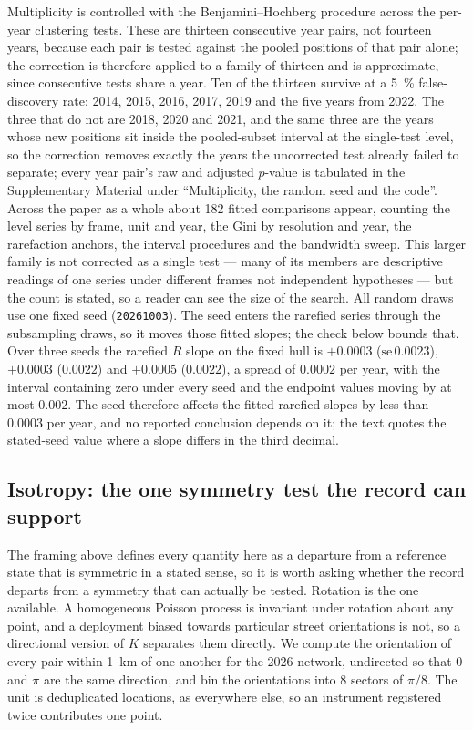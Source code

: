 \documentclass{article}
\newcommand{\nComp}{182}
\newcommand{\randSeed}{20261003}
\begin{document}
Multiplicity is controlled with the Benjamini--Hochberg procedure
\cite{benjamini1995controlling} across the per-year clustering tests. These are thirteen
consecutive year pairs, not fourteen years, because each pair is tested against the pooled
positions of that pair alone; the correction is therefore applied to a family of thirteen and is
approximate, since consecutive tests share a year. Ten of the thirteen survive at a
\SI{5}{\percent} false-discovery rate: 2014, 2015, 2016, 2017, 2019 and the five years from 2022.
The three that do not are 2018, 2020 and 2021, and the same three are the years whose new
positions sit inside the pooled-subset interval at the single-test level, so the correction
removes exactly the years the uncorrected test already failed to separate; every year pair's raw
and adjusted $p$-value is tabulated in the Supplementary Material under ``Multiplicity, the random
seed and the code''.
Across the paper as a whole about \nComp{} fitted comparisons appear, counting the level
series by frame, unit and year, the Gini by resolution and year, the rarefaction anchors, the
interval procedures and the bandwidth sweep. This larger family is not corrected as a single
test --- many of its members are descriptive readings of one series under different frames
not independent hypotheses --- but the count is stated, so a reader can see the size of
the search.
All random draws use one fixed seed (\texttt{\randSeed}). The seed enters the rarefied series
through the subsampling draws, so it moves those fitted slopes; the check below bounds that.
Over three seeds the rarefied $R$ slope on the fixed hull is
$+0.0003$ ($\mathrm{se}\,0.0023$), $+0.0003$ ($0.0022$) and $+0.0005$ ($0.0022$), a spread of
$0.0002$ per year, with the interval containing zero under every seed and the endpoint values
moving by at most $0.002$. The seed therefore affects the fitted rarefied slopes by less than
$0.0003$ per year, and no reported conclusion depends on it; the text quotes the stated-seed
value where a slope differs in the third decimal.

\subsection{Isotropy: the one symmetry test the record can support}
\label{sec:isotropy}

The framing above defines every quantity here as a departure from a reference state that is
symmetric in a stated sense, so it is worth asking whether the record departs from a symmetry
that can actually be tested. Rotation is the one available. A homogeneous Poisson process is
invariant under rotation about any point, and a deployment biased towards particular street
orientations is not, so a directional version of $K$ separates them directly. We compute the
orientation of every pair within \SI{1}{\kilo\meter} of one another for the 2026 network,
undirected so that $0$ and $\pi$ are the same direction, and bin the orientations into
\num{8} sectors of $\pi/8$. The unit is deduplicated locations, as everywhere else, so an
instrument registered twice contributes one point.
\end{document}
